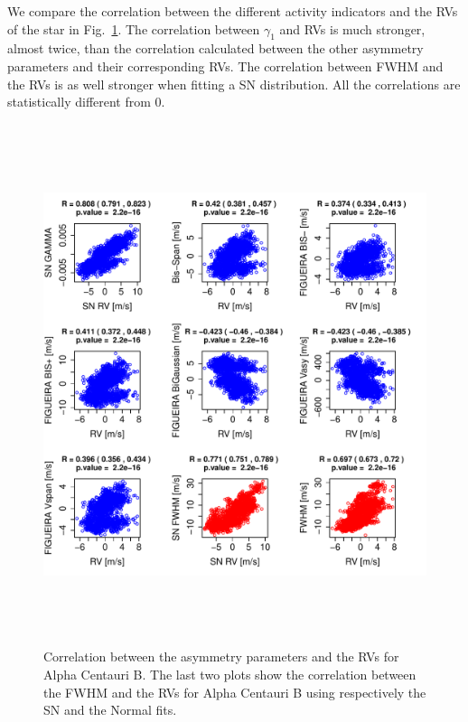 \documentclass[11pt, oneside]{article}
\begin{document}
We compare the correlation between the different activity indicators and the RVs of the star in Fig.~\ref{fig:alphacent:corrPlot}. The correlation between $\gamma_1$ and RVs is much stronger, almost twice, than the correlation calculated between the other asymmetry parameters and their corresponding RVs. The correlation between FWHM and the RVs is as well stronger when fitting a SN distribution. All the correlations are statistically different from $0$.

\begin{figure}[htbp]
   \centering
\includegraphics[height = 6in]{HD12862_[4]Comparison_para.pdf}  
   \caption{Correlation between the asymmetry parameters and the RVs for Alpha Centauri B. The last two plots show the correlation between the FWHM and the RVs for Alpha Centauri B using respectively the SN and the Normal fits.}
   \label{fig:alphacent:corrPlot}
\end{figure}
\end{document}

